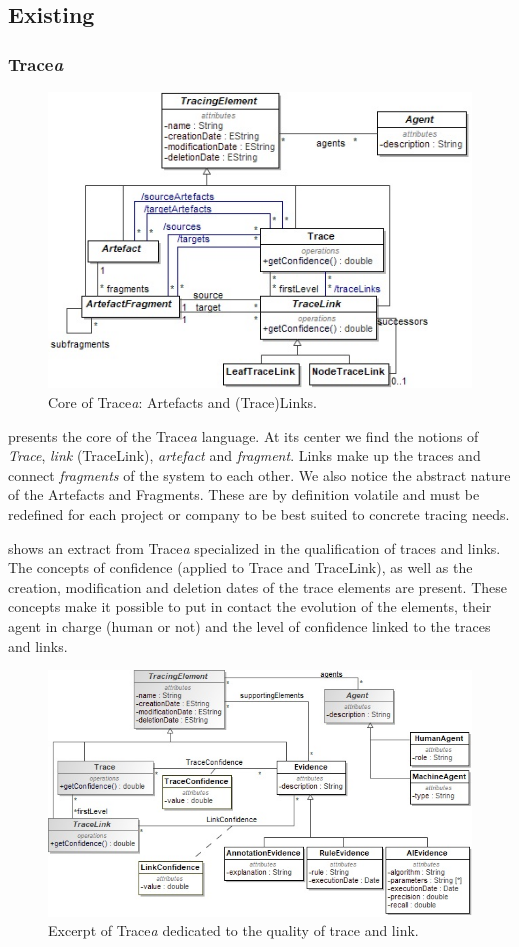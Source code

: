 \subsection{Existing}
\subsubsection{Trace\textit{a}}
\begin{figure}[ht]     
	\centering
	\includegraphics[width=.8\linewidth]{images/core.jpg}
	\caption{Core of Trace\textit{a}: Artefacts and (Trace)Links.}
	\label{fig:mm-core}
\end{figure}


 presents the core of the Trace\textit{a} language. At its center we find the notions of \textit{Trace}, \textit{link} (TraceLink), \textit{artefact} and \textit{fragment}. Links make up the traces and connect \textit{fragments} of the system to each other. We also notice the abstract nature of the Artefacts and Fragments. These are by definition volatile and must be redefined for each project or company to be best suited to concrete tracing needs.

 shows an extract from Trace\textit{a} specialized in the qualification of traces and links. The concepts of confidence (applied to Trace and TraceLink), as well as the creation, modification and deletion dates of the trace elements are present. These concepts make it possible to put in contact the evolution of the elements, their agent in charge (human or not) and the level of confidence linked to the traces and links. 

\begin{figure}[h]     
	\centering
	\includegraphics[width=.8\linewidth]{images/explainability.jpg}
	\caption{Excerpt of Trace\textit{a} dedicated to the quality of trace and link.}
	\label{fig:mm-explainability}
\end{figure}

